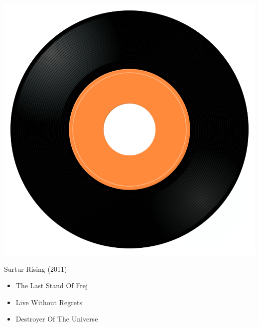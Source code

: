 \begin{minipage}[t]{0.25\textwidth}\vspace{0pt}
\captionsetup{type=figure}
\includegraphics[width=\textwidth]{Images/cover.png}
\caption*{Surtur Rising (2011)}
\end{minipage}
\begin{minipage}[t]{0.25\textwidth}\vspace{0pt}
\begin{itemize}[nosep,leftmargin=1em,labelwidth=*,align=left]
	\setlength{\itemsep}{0pt}
	\item The Last Stand Of Frej
	\item Live Without Regrets
	\item Destroyer Of The Universe
\end{itemize}
\end{minipage}
